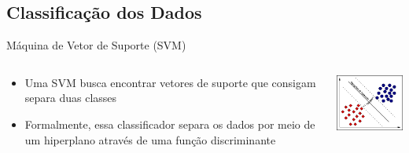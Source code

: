 \documentclass{beamer}
\begin{document}
\subsection{Classificação dos Dados}
\begin{frame}{Máquina de Vetor de Suporte (SVM)}
   \begin{block}{}
   
   \begin{columns}[c]
     \begin{column}{0.5\linewidth}
			 \begin{itemize}
			        \item Uma SVM busca encontrar vetores de suporte que consigam separa duas classes
			        

				\item Formalmente, essa classificador separa os dados por meio de um hiperplano através de uma função discriminante
			\end{itemize}
     \end{column}

     \begin{column}{0.5\linewidth}
				\includegraphics[width=4cm]{img/svmhyperplane.png}
    \end{column}
\end{columns}
\end{block}
\end{frame}

\end{document}
